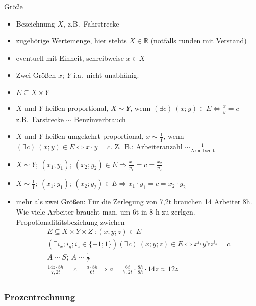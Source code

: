 Größe
\begin{itemize}
    \item Bezeichnung $X$, z.B.\ Fahrstrecke
    \item zugehörige Wertemenge, hier stehts $X\in \mathbb{R}$ (notfalls runden mit Verstand)
    \item eventuell mit Einheit, schreibweise $x \in X$
    \item Zwei Größen $x;\ Y$ i.a.\ nicht unabhänig.
    \item $E \subseteq X \times Y$
    \item $X$ und $Y$ heißen proportional, $X \sim Y$, wenn $(\exists c)\ (x;y) \in E \Leftrightarrow \frac{x}{y}=c$ z.B.\ Farstrecke $\sim$ Benzinverbrauch
    \item $X$ und $Y$ heißen umgekehrt proportional, $x \sim \frac{1}{Y}$, wenn $(\exists c)\ (x;y) \in E \Leftrightarrow x \cdot y = c$.
    Z.~B.: Arbeiteranzahl $\sim \frac{1}{\textrm{Arbeitszeit}}$
    \item $X \sim Y;\ (x_1;y_1);\ (x_2;y_2) \in E \Rightarrow \frac{x_1}{y_1} = c = \frac{x_2}{y_2}$
    \item $X \sim \frac{1}{Y};\ (x_1;y_1);\ (x_2;y_2) \in E \Rightarrow x_1 \cdot y_1 = c = x_2 \cdot y_2$
    \item mehr als zwei Größen: Für die Zerlegung von 7,2t brauchen 14 Arbeiter 8h.
    Wie viele Arbeiter braucht man, um 6t in 8 h zu zerlgen. \\
    Propotionalitätsbeziehung zwichen \begin{gather*}
                                          E \subseteq X \times  Y \times Z\ : (x; y; z) \in E\\
                                          (\exists i_x; i_y; i_z \in \lbrace -1; 1 \rbrace) (\exists c)\ (x;y;z) \in E \Leftrightarrow x^{i_x}y^{i_y}z^{i_z} = c\\
                                          A \sim S;\ A \sim \frac{1}{T}\\
                                          \frac{14z \cdot 8h}{7{,}2t}=c=\frac{a \cdot 8h}{6t} \Rightarrow a = \frac{6t}{7{,}2t}\cdot \frac{8h}{8h} \cdot 14z \approx 12z\\
    \end{gather*}
\end{itemize}

\subsubsection{Prozentrechnung}

